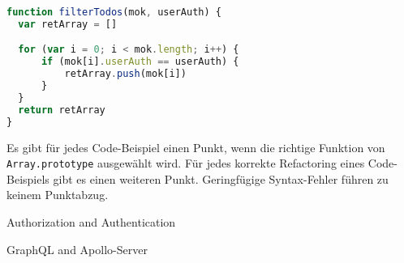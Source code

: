 \documentclass[addpoints]{exam}
\begin{document}
\begin{questions}
\begin{parts}
\begin{lstlisting}[extendedchars=true,basicstyle=\footnotesize\ttfamily,language=JavaScript]
function filterTodos(mok, userAuth) {
  var retArray = []

  for (var i = 0; i < mok.length; i++) {
      if (mok[i].userAuth == userAuth) {
          retArray.push(mok[i])
      }
  }
  return retArray
}
\end{lstlisting}
\makeemptybox{12em}

\begin{subparts}
  \subpart[3]
  Es gibt für jedes Code-Beispiel einen Punkt, wenn die richtige Funktion von
  \texttt{Array.prototype} ausgewählt wird.
  \subpart[3]
  Für jedes korrekte Refactoring eines Code-Beispiels gibt es einen weiteren
  Punkt. Geringfügige Syntax-Fehler führen zu keinem Punktabzug.
\end{subparts}
\end{parts}


\question Authorization and Authentication

\question GraphQL and Apollo-Server

\begin{parts}

\end{parts}
\end{questions}
\end{document}

